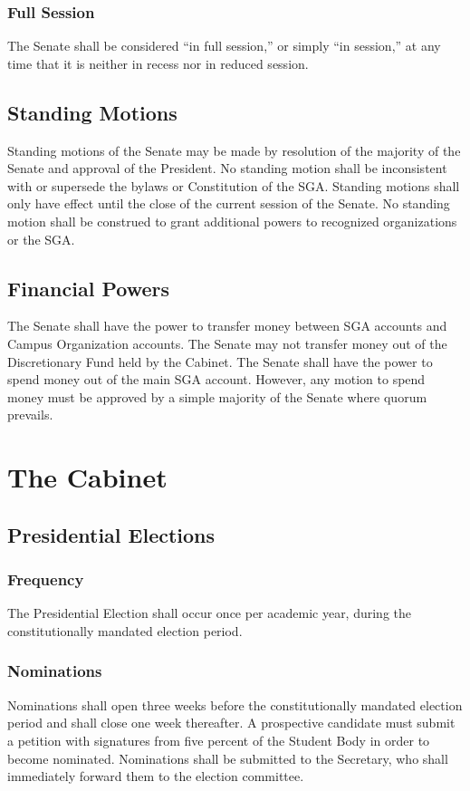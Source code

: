 \documentclass[12pt]{scrreprt}
\begin{document}
\subsection{Full Session}
The Senate shall be considered ``in full session,'' or simply ``in session,'' 
at any time that it is neither in recess nor in reduced session. 

\section{Standing Motions}
Standing motions of the Senate may be made by resolution of the majority of 
the Senate and approval of the President. No standing motion shall be 
inconsistent with or supersede the bylaws or Constitution of the SGA. Standing 
motions shall only have effect until the close of the current session of the 
Senate. No standing motion shall be construed to grant additional powers to 
recognized organizations or the SGA. 

\section{Financial Powers}
The Senate shall have the power to transfer money between SGA accounts and 
Campus Organization accounts. The Senate may not transfer money out of the 
Discretionary Fund held by the Cabinet. The Senate shall have the power to 
spend money out of the main SGA account. However, any motion to spend money must be approved by a simple majority of the Senate where quorum prevails. 

\chapter{The Cabinet}

\section{Presidential Elections}

\subsection{Frequency}
The Presidential Election shall occur once per academic year, during the 
constitutionally mandated election period. 

\subsection{Nominations}
Nominations shall open three weeks before the constitutionally mandated 
election period and shall close one week thereafter. A prospective candidate 
must submit a petition with signatures from five percent of the Student Body 
in order to become nominated. Nominations shall be submitted to the Secretary, 
who shall immediately forward them to the election committee. 
\end{document}
